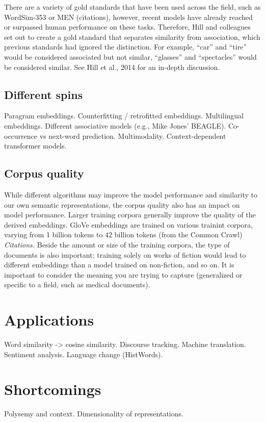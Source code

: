 There are a variety of gold standards that have been used across the field, such as WordSim-353 or MEN (citations), however, recent models have already reached or surpassed human performance on these tasks.
Therefore, Hill and colleagues set out to create a gold standard that separates similarity from association, which previous standards had ignored the distinction.
For example, ``car'' and ``tire'' would be considered associated but not similar, ``glasses'' and ``spectacles'' would be considered similar. See Hill et al., 2014 for an in-depth discussion.

\subsection{Different spins}
Paragram embeddings.
Counterfitting / retrofitted embeddings.
Multilingual embeddings.
Different associative models (e.g., Mike Jones' BEAGLE).
Co-occurrence vs next-word prediction.
Multimodality.
Context-dependent transformer models.

\subsection{Corpus quality}

While different algorithms may improve the model performance and similarity to our own semantic representations, the corpus quality also has an impact on model performance.
Larger training corpora generally improve the quality of the derived embeddings. 
GloVe embeddings are trained on various trainint corpora, varying from 1 billion tokens to 42 billion tokens (from the Common Crawl) \textit{Citations.}
Beside the amount or size of the training corpora, the type of documents is also important; training solely on works of fiction would lead to different embeddings than a model trained on non-fiction, and so on. It is important to consider the meaning you are trying to capture (generalized or specific to a field, such as medical documents).

\section{Applications}
Word similarity -> cosine similarity.
Discourse tracking.
Machine translation.
Sentiment analysis.
Language change (HistWords).

\section{Shortcomings}
Polysemy and context.
Dimensionality of representations.

